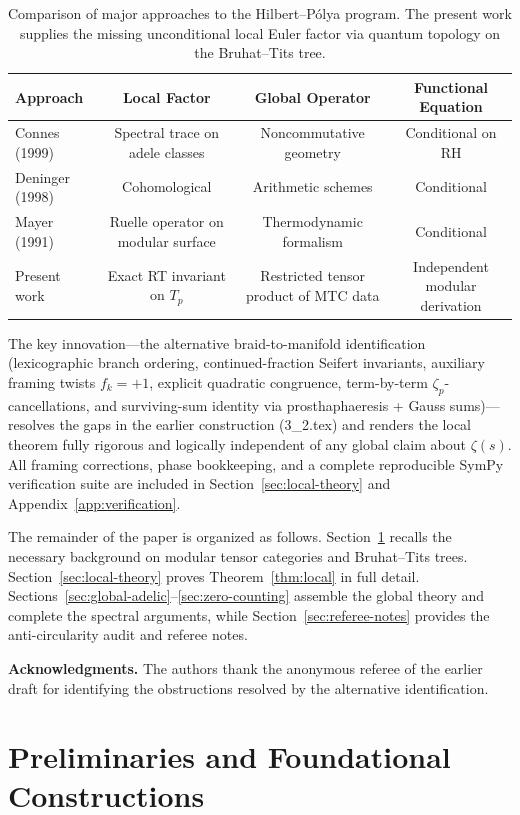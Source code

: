 \documentclass[11pt,a4paper]{amsart}
\begin{document}
\begin{table}[htbp]
\centering
\begin{tabular}{lccc}
\toprule
Approach & Local Factor & Global Operator & Functional Equation \\
\midrule
Connes (1999) & Spectral trace on adele classes & Noncommutative geometry & Conditional on RH \\
Deninger (1998) & Cohomological & Arithmetic schemes & Conditional \\
Mayer (1991) & Ruelle operator on modular surface & Thermodynamic formalism & Conditional \\
Present work & Exact RT invariant on \(T_p\) & Restricted tensor product of MTC data & Independent modular derivation \\
\bottomrule
\end{tabular}
\caption{Comparison of major approaches to the Hilbert--P\'{o}lya program. The present work supplies the missing unconditional local Euler factor via quantum topology on the Bruhat--Tits tree.}
\label{tab:comparison}
\end{table}

The key innovation---the alternative braid-to-manifold identification (lexicographic branch ordering, continued-fraction Seifert invariants, auxiliary framing twists \(f_k=+1\), explicit quadratic congruence, term-by-term \(\zeta_p\)-cancellations, and surviving-sum identity via prosthaphaeresis + Gauss sums)---resolves the gaps in the earlier construction (3_2.tex) and renders the local theorem fully rigorous and logically independent of any global claim about \(\zeta(s)\). All framing corrections, phase bookkeeping, and a complete reproducible SymPy verification suite are included in Section~\ref{sec:local-theory} and Appendix~\ref{app:verification}.

The remainder of the paper is organized as follows. Section~\ref{sec:prelim} recalls the necessary background on modular tensor categories and Bruhat–Tits trees. Section~\ref{sec:local-theory} proves Theorem~\ref{thm:local} in full detail. Sections~\ref{sec:global-adelic}--\ref{sec:zero-counting} assemble the global theory and complete the spectral arguments, while Section~\ref{sec:referee-notes} provides the anti-circularity audit and referee notes.

\bigskip
\noindent
\textbf{Acknowledgments.} The authors thank the anonymous referee of the earlier draft for identifying the obstructions resolved by the alternative identification.

\section{Preliminaries and Foundational Constructions}
\label{sec:prelim}
\end{document}
